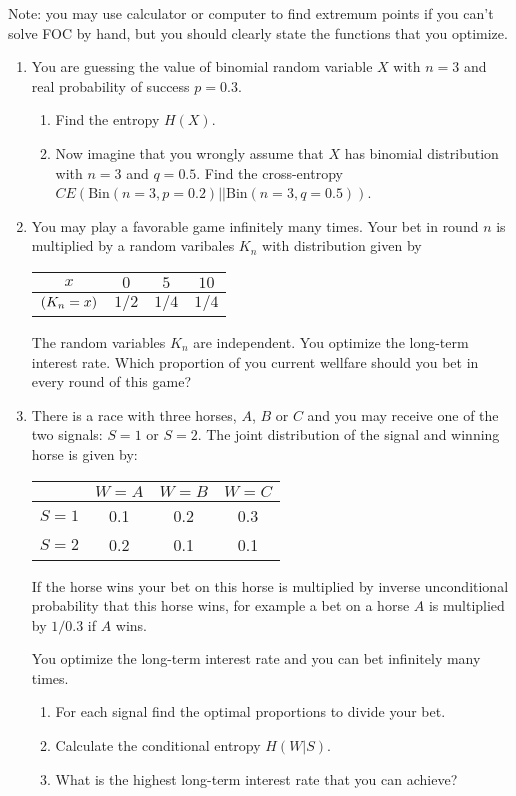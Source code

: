 \documentclass[12pt]{article}
\let\P\relax
\DeclareMathOperator{\P}{\mathbb{P}}
\newcommand{\dBin}{\mathrm{Bin}}
\begin{document}
Note: you may use calculator or computer to find extremum points if you can't solve FOC by hand, 
but you should clearly state the functions that you optimize.


\begin{enumerate}
\item You are guessing the value of binomial random variable $X$ with $n=3$ and real probability of success $p=0.3$.
\begin{enumerate}
    \item Find the entropy $H(X)$. 
    \item Now imagine that you wrongly assume that $X$ has binomial distribution with $n=3$ and $q=0.5$.
    Find the cross-entropy $CE(\dBin(n=3, p=0.2)||\dBin(n=3, q=0.5))$.
\end{enumerate}
\item You may play a favorable game infinitely many times. 
Your bet in round $n$ is multiplied by a random varibales $K_n$ with distribution given by 

\begin{tabular}{*{4}{c}}
    \toprule
    $x$ & $0$ & $5$ & $10$  \\
    \midrule
    $\P(K_n=x)$ & $1/2$ & $1/4$ & $1/4$ \\
    \bottomrule
\end{tabular}

The random variables $K_n$ are independent. 
You optimize the long-term interest rate. 
Which proportion of you current wellfare should you bet in every round of this game?

\item There is a race with three horses, $A$, $B$ or $C$ and you may receive one of the two signals: $S=1$ or $S=2$.
The joint distribution of the signal and winning horse is given by:

\begin{tabular}{*{4}{c}}
    \toprule
    & $W=A$ & $W=B$ & $W=C$ \\
    \midrule
    $S=1$ & 0.1 & 0.2 & 0.3  \\
    $S=2$ & 0.2 & 0.1 & 0.1  \\
    \bottomrule
\end{tabular}

If the horse wins your bet on this horse is multiplied by inverse unconditional  probability that this horse wins, 
for example a bet on a horse $A$ is multiplied by $1/0.3$ if $A$ wins. 

You optimize the long-term interest rate and you can bet infinitely many times. 

\begin{enumerate}
    \item For each signal find the optimal proportions to divide your bet.
    \item Calculate the conditional entropy $H(W|S)$.
    \item What is the highest long-term interest rate that you can achieve?
\end{enumerate}

\end{enumerate}
\end{document}
